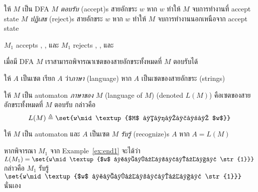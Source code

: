 \begin{definition}
ให้ $M$ เป็น DFA \enskip $M$ \emph{ตอบรับ} (accept)s สายอักขระ $w$ หาก $w$ ทำให้ $M$ จบการทำงานที่ accept state \enskip $M$ \emph{ปฏิเสธ} (reject)s สายอักขระ $w$ หาก $w$ ทำให้ $M$ จบการทำงานนอกเหนือจาก accept state
\end{definition}
%
\begin{example}
$M_1$ accepts , , และ  \enskip $M_1$ rejects , , และ 
\end{example}

เมื่อมี DFA $M$ เราสามารถพิจารณาเซตของสายอักขระทั้งหมดที่ $M$ ตอบรับได้
\begin{definition}
ให้ $A$ เป็นเซต \enskip เรียก $A$ ว่า\emph{ภาษา} (language) หาก $A$ เป็นเซตของสายอักขระ (strings)
\end{definition}
%
\begin{definition}
ให้ $M$ เป็น automaton \enskip \emph{ภาษาของ $M$} (language of $M$) (denoted $L(M)$) คือเซตของสายอักขระทั้งหมดที่ $M$ ตอบรับ กล่าวคือ \[L(M)\triangleq\set{w\mid\textup{$M$ ตอบรับ $w$}}\]
\end{definition}
\begin{definition}
ให้ $M$ เป็น automaton และ $A$ เป็นเซต \enskip $M$ \emph{รับรู้} (recognize)s $A$ หาก $A=L(M)$
\end{definition}
%
\begin{example}
หากพิจารณา $M_1$ จาก Example~\ref{ex:end1} จะได้ว่า $L(M_1)=\set{w\mid\textup{$w$ ลงท้ายด้วย \str{1}}}$ กล่าวคือ $M_1$ รับรู้ $\set{w\mid\textup{$w$ ลงท้ายด้วย \str{1}}}$ นั่นเอง
\end{example}

